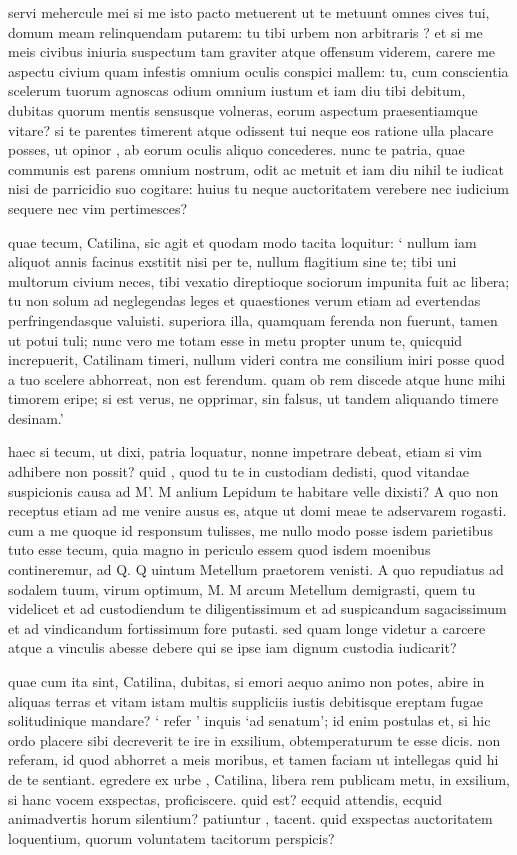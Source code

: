  servi mehercule mei si me isto pacto metuerent ut te metuunt omnes cives tui, domum meam relinquendam putarem: tu tibi urbem non arbitraris ? et si me meis civibus iniuria suspectum tam graviter atque offensum viderem, carere me aspectu civium quam infestis omnium oculis conspici mallem: tu, cum conscientia scelerum tuorum agnoscas odium omnium iustum et iam diu tibi debitum, dubitas quorum mentis sensusque volneras, eorum aspectum praesentiamque vitare? si te parentes timerent atque odissent tui neque eos ratione ulla placare posses, ut opinor , ab eorum oculis aliquo concederes. nunc te patria, quae communis est parens omnium nostrum, odit ac metuit et iam diu nihil te iudicat nisi de parricidio suo cogitare: huius tu neque auctoritatem verebere nec iudicium sequere nec vim pertimesces?

 quae tecum, Catilina, sic agit et quodam modo tacita loquitur: ` nullum iam aliquot annis facinus exstitit nisi per te, nullum flagitium sine te; tibi uni multorum civium neces, tibi vexatio direptioque sociorum impunita fuit ac libera; tu non solum ad neglegendas leges et quaestiones verum etiam ad evertendas perfringendasque valuisti. superiora illa, quamquam ferenda non fuerunt, tamen ut potui tuli; nunc vero me totam esse in metu propter unum te, quicquid increpuerit, Catilinam timeri, nullum videri contra me consilium iniri posse quod a tuo scelere abhorreat, non est ferendum. quam ob rem discede atque hunc mihi timorem eripe; si est verus, ne opprimar, sin falsus, ut tandem aliquando timere desinam.'

 haec si tecum, ut dixi, patria loquatur, nonne impetrare debeat, etiam si vim adhibere non possit? quid , quod tu te in custodiam dedisti, quod vitandae suspicionis causa ad M'. M anlium Lepidum te habitare velle dixisti? A quo non receptus etiam ad me venire ausus es, atque ut domi meae te adservarem rogasti. cum a me quoque id responsum tulisses, me nullo modo posse isdem parietibus tuto esse tecum, quia magno in periculo essem quod isdem moenibus contineremur, ad Q. Q uintum Metellum praetorem venisti. A quo repudiatus ad sodalem tuum, virum optimum, M. M arcum Metellum demigrasti, quem tu videlicet et ad custodiendum te diligentissimum et ad suspicandum sagacissimum et ad vindicandum fortissimum fore putasti. sed quam longe videtur a carcere atque a vinculis abesse debere qui se ipse iam dignum custodia iudicarit?

 quae cum ita sint, Catilina, dubitas, si emori aequo animo non potes, abire in aliquas terras et vitam istam multis suppliciis iustis debitisque ereptam fugae solitudinique mandare? ` refer ' inquis `ad senatum'; id enim postulas et, si hic ordo placere sibi decreverit te ire in exsilium, obtemperaturum te esse dicis. non referam, id quod abhorret a meis moribus, et tamen faciam ut intellegas quid hi de te sentiant. egredere ex urbe , Catilina, libera rem publicam metu, in exsilium, si hanc vocem exspectas, proficiscere. quid est? ecquid attendis, ecquid animadvertis horum silentium? patiuntur , tacent. quid exspectas auctoritatem loquentium, quorum voluntatem tacitorum perspicis?


